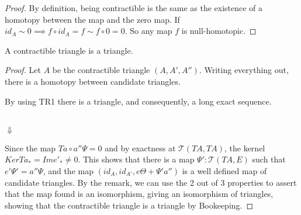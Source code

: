     \begin{proof}
        By definition, being contractible is the same as the existence of a homotopy between the map and the zero map. If $id_A\sim 0 \implies f\circ id_A = f \sim f\circ 0 = 0$. So any map $f$ is null-homotopic.
    \end{proof}

    \begin{lemma}
        A contractible triangle is a triangle.
    \end{lemma}

    \begin{proof}
        Let $A$ be the contractible triangle $(A,A',A'')$. Writing everything out, there is a homotopy between candidate triangles.
        \begin{center}
        \end{center}
        By using TR1 there is a triangle, and consequently, a long exact sequence.
        \begin{center}
             \\
            $\Downarrow$ \\
        \end{center}
        Since the map $Ta\circ a''\Psi = 0$ and by exactness at $\mathcal{T}(TA,TA)$, the kernel $KerTa_*=Ime'_*\neq 0$. This shows that there is a map ${\Psi}':\mathcal{T}(TA,E)$ such that $e'{\Psi}'=a''\Psi$, and the map $(id_A,id_{A'},e\Theta+{\Psi}'a'')$ is a well defined map of candidate triangles. By the remark, we can use the 2 out of 3 properties to assert that the map found is an isomorphism, giving an isomorphism of triangles, showing that the contractible triangle is a triangle by Bookeeping. 
    \end{proof}

